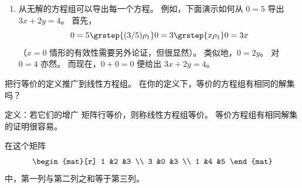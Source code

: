 \begin{exercises}
\begin{answer}
\begin{enumerate}
          \begin{equation*}
            0=3
          \end{equation*}
          想要一个不那么抬杠的答案，求解该方程组：
          \begin{equation*}
            \begin{amat}[r]{2}
              3  &4  &8  \\
              2  &1   &3
            \end{amat}
            \grstep{-(2/3)\rho_1+\rho_2}
            \begin{amat}[r]{2}
              3  &4    &8    \\
              0  &-5/3 &-7/3
            \end{amat}
          \end{equation*}
          得到 \( y=7/5 \) 与 \( x=4/5 \)。
          于是任何不被 \( (7/5,4/5) \) 满足的方程都可以，
          例如 \( 5x+5y=10 \)。
        \item 从无解的方程组可以导出每一个方程。
          例如，下面演示如何从
          \( 0=5 \) 导出 \( 3x+2y=4 \)。
          首先，
          \begin{equation*}
            0=5
            \grstep{(3/5)\rho_1}
            0=3
            \grstep{x\rho_1}
            0=3x
          \end{equation*}
          （\( x=0 \) 情形的有效性需要另外论证，但很显然）。
          类似地，\( 0=2y \)。
          对 \( 0=4 \) 亦然。
          而现在，\( 0+0=0 \) 便给出 \( 3x+2y=4 \)。
     \end{enumerate}  
    \end{answer}
  \item 
    \cite{HoffmanKunze}
    把行等价的定义推广到线性方程组。
    在你的定义下，等价的方程组有相同的解集吗？
    \begin{answer}
      定义：若它们的增广
      矩阵行等价，则称线性方程组等价。
      等价方程组有相同解集的证明很容易。  
    \end{answer}
  \item 
    在这个矩阵
    \begin{equation*}
      \begin{mat}[r]
        1  &2  &3  \\
        3  &0  &3  \\
        1  &4  &5
      \end{mat}
    \end{equation*}
    中，第一列与第二列之和等于第三列。
    \begin{exparts}

\end{exparts}
\end{exercises}
